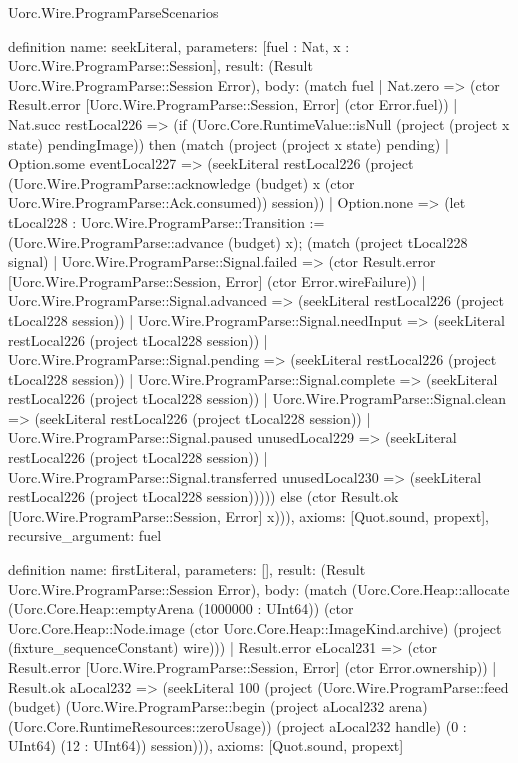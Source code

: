 \begin{lexlean}{Uorc.Wire.ProgramParseScenarios}
\begin{semanticmodule}
definition{
  name: seekLiteral,
  parameters: [fuel : Nat, x : Uorc.Wire.ProgramParse::Session],
  result: (Result Uorc.Wire.ProgramParse::Session Error),
  body: (match fuel
    | Nat.zero => (ctor Result.error [Uorc.Wire.ProgramParse::Session, Error] (ctor Error.fuel))
    | Nat.succ restLocal226 => (if (Uorc.Core.RuntimeValue::isNull (project (project x state) pendingImage)) then (match (project (project x state) pending)
      | Option.some eventLocal227 => (seekLiteral restLocal226 (project (Uorc.Wire.ProgramParse::acknowledge (budget) x (ctor Uorc.Wire.ProgramParse::Ack.consumed)) session))
      | Option.none => (let tLocal228 : Uorc.Wire.ProgramParse::Transition := (Uorc.Wire.ProgramParse::advance (budget) x); (match (project tLocal228 signal)
        | Uorc.Wire.ProgramParse::Signal.failed => (ctor Result.error [Uorc.Wire.ProgramParse::Session, Error] (ctor Error.wireFailure))
        | Uorc.Wire.ProgramParse::Signal.advanced => (seekLiteral restLocal226 (project tLocal228 session))
        | Uorc.Wire.ProgramParse::Signal.needInput => (seekLiteral restLocal226 (project tLocal228 session))
        | Uorc.Wire.ProgramParse::Signal.pending => (seekLiteral restLocal226 (project tLocal228 session))
        | Uorc.Wire.ProgramParse::Signal.complete => (seekLiteral restLocal226 (project tLocal228 session))
        | Uorc.Wire.ProgramParse::Signal.clean => (seekLiteral restLocal226 (project tLocal228 session))
        | Uorc.Wire.ProgramParse::Signal.paused unusedLocal229 => (seekLiteral restLocal226 (project tLocal228 session))
        | Uorc.Wire.ProgramParse::Signal.transferred unusedLocal230 => (seekLiteral restLocal226 (project tLocal228 session))))) else (ctor Result.ok [Uorc.Wire.ProgramParse::Session, Error] x))),
  axioms: [Quot.sound, propext],
  recursive_argument: fuel
}

definition{
  name: firstLiteral,
  parameters: [],
  result: (Result Uorc.Wire.ProgramParse::Session Error),
  body: (match (Uorc.Core.Heap::allocate (Uorc.Core.Heap::emptyArena (1000000 : UInt64)) (ctor Uorc.Core.Heap::Node.image (ctor Uorc.Core.Heap::ImageKind.archive) (project (fixture_sequenceConstant) wire)))
    | Result.error eLocal231 => (ctor Result.error [Uorc.Wire.ProgramParse::Session, Error] (ctor Error.ownership))
    | Result.ok aLocal232 => (seekLiteral 100 (project (Uorc.Wire.ProgramParse::feed (budget) (Uorc.Wire.ProgramParse::begin (project aLocal232 arena) (Uorc.Core.RuntimeResources::zeroUsage)) (project aLocal232 handle) (0 : UInt64) (12 : UInt64)) session))),
  axioms: [Quot.sound, propext]
}


\end{semanticmodule}
\end{lexlean}
